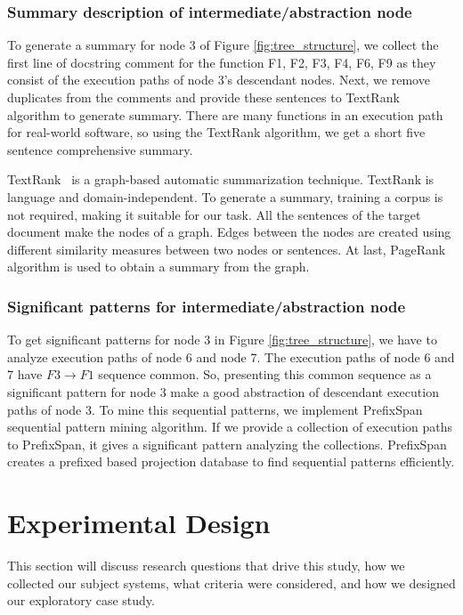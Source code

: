 \subsubsection{Summary description of intermediate/abstraction node}
To generate a summary for node 3 of Figure \ref{fig:tree_structure}, we collect the first line of docstring comment for the function F1, F2, F3, F4, F6, F9 as they consist of the execution paths of node 3's descendant nodes. Next, we remove duplicates from the comments and provide these sentences to TextRank \cite{barrios2016variationsTextRankSummarization} algorithm to generate summary. There are many functions in an execution path for real-world software, so using the TextRank algorithm, we get a short five sentence comprehensive summary. 

TextRank~\cite{barrios2016variationsTextRankSummarization} is a graph-based automatic summarization technique. TextRank is language and domain-independent. To generate a summary, training a corpus is not required, making it suitable for our task. All the sentences of the target document make the nodes of a graph. Edges between the nodes are created using different similarity measures between two nodes or sentences. At last, PageRank~\cite{page1999pagerank} algorithm is used to obtain a summary from the graph.

\subsubsection{Significant patterns for intermediate/abstraction node}
To get significant patterns for node 3 in Figure \ref{fig:tree_structure}, we have to analyze execution paths of node 6 and node 7. The execution paths of node 6 and 7 have $ F3 \rightarrow  F1 $ sequence common. So, presenting this common sequence as a significant pattern for node 3 make a good abstraction of descendant execution paths of node 3. To mine this sequential patterns, we implement PrefixSpan \cite{han2001prefixspanSequentialPatterns} sequential pattern mining algorithm. If we provide a collection of execution paths to PrefixSpan, it gives a significant pattern analyzing the collections. PrefixSpan creates a prefixed based projection database to find sequential patterns efficiently.

\section{Experimental Design}
\label{hla2:evaluation}
This section will discuss research questions that drive this study, how we collected our subject systems, what criteria were considered, and how we designed our exploratory case study. 

